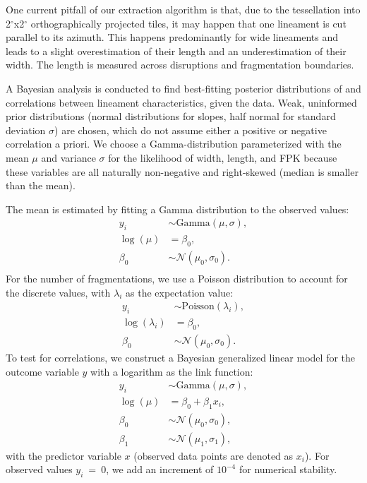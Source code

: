 One current pitfall of our extraction algorithm is that, due to the tessellation into 2$^{\circ}$x2$^{\circ}$ orthographically projected tiles, it may happen that one lineament is cut parallel to its azimuth. This happens predominantly for wide lineaments and leads to a slight overestimation of their length and an underestimation of their width. The length is measured across disruptions and fragmentation boundaries.

A Bayesian analysis is conducted to find best-fitting posterior distributions of and correlations between lineament characteristics, given the data. Weak, uninformed prior distributions (normal distributions for slopes, half normal for standard deviation $\sigma$) are chosen, which do not assume either a positive or negative correlation a priori. We choose a Gamma-distribution parameterized with the mean $\mu$ and variance $\sigma$ for the likelihood of width, length, and FPK because these variables are all naturally non-negative and right-skewed (median is smaller than the mean). 

The mean is estimated by fitting a Gamma distribution to the observed values:
\begin{align}\label{eq_gamma_GLM}
    y_i  &\sim \text{Gamma}(\mu, \sigma),\\
    \log(\mu) &= \beta_0,\\
    \beta_0  &\sim \mathcal{N}(\mu_0,\sigma_0). \\
\end{align}
For the number of fragmentations, we use a Poisson distribution to account for the discrete values, with $\lambda_i$ as the expectation value:
\begin{align}\label{eq_poisson_GLM}
    y_i  &\sim \text{Poisson}(\lambda_i),\\
    \log(\lambda_i) &= \beta_0, \\ %
    \beta_0  &\sim \mathcal{N}(\mu_0,\sigma_0).
\end{align}
To test for correlations, we construct a Bayesian generalized linear model for the outcome variable $y$ with a logarithm as the link function:
\begin{align}
    y_i  &\sim \text{Gamma}(\mu, \sigma),\\
    \log(\mu) &= \beta_0 + \beta_1 x_i,\\
    \beta_0  &\sim \mathcal{N}(\mu_0,\sigma_0), \\
    \beta_1 &\sim \mathcal{N}(\mu_1,\sigma_1),
\end{align}
with the predictor variable $x$ (observed data points are denoted as $x_i$). For observed values $y_i~=~0$, we add an increment of $10^{-4}$ for numerical stability. 

